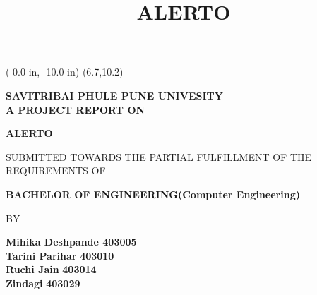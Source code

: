 \documentclass[12pt,a4paper]{report}
\author{}
\title{ALERTO}
\begin{document}
\pagestyle{empty}
\newpage
\pagestyle{empty}
\thisfancyput(-0.0 in, -10.0 in) {\setlength{\unitlength}{1 in}\framebox(6.7,10.2)}

\begin{center}
	\vspace*{0.2 in}
	\textbf{\large{SAVITRIBAI PHULE PUNE UNIVESITY}}\\
  \vspace*{0.25 in}
\textbf{A PROJECT REPORT ON}
\vspace{0.05 in}
  \end{center}
\vspace{0.05 in}
	\begin{center}
		\textbf{\large{ALERTO}} \\
	\end{center}
	
	\vspace{0.1 in}
	\begin{center}
	SUBMITTED TOWARDS THE PARTIAL FULFILLMENT OF THE REQUIREMENTS OF
\end{center}
	\vspace{0.1 in}
	\begin{center}
			\textbf{BACHELOR OF ENGINEERING(Computer Engineering)}
     	\end{center}
     \vspace{0.3 in}
		\begin{center}
	    BY
	\end{center}
	
	
	\begin{flushleft}
		\begin{flushleft}
\hspace{1.7in}\textbf{Mihika Deshpande     403005}\\
\hspace{1.7in}\textbf{Tarini Parihar}    
 \hspace{0.3in}\textbf{  403010}\\
\hspace{1.7in}\textbf{Ruchi Jain}\hspace{0.65in}\textbf{           403014}\\
\hspace{1.7in}\textbf{Zindagi}\hspace{0.94in}\textbf{              403029}\\
\end{flushleft}
	\end{flushleft}
	\vspace{0.2 in}
	
\end{document}
